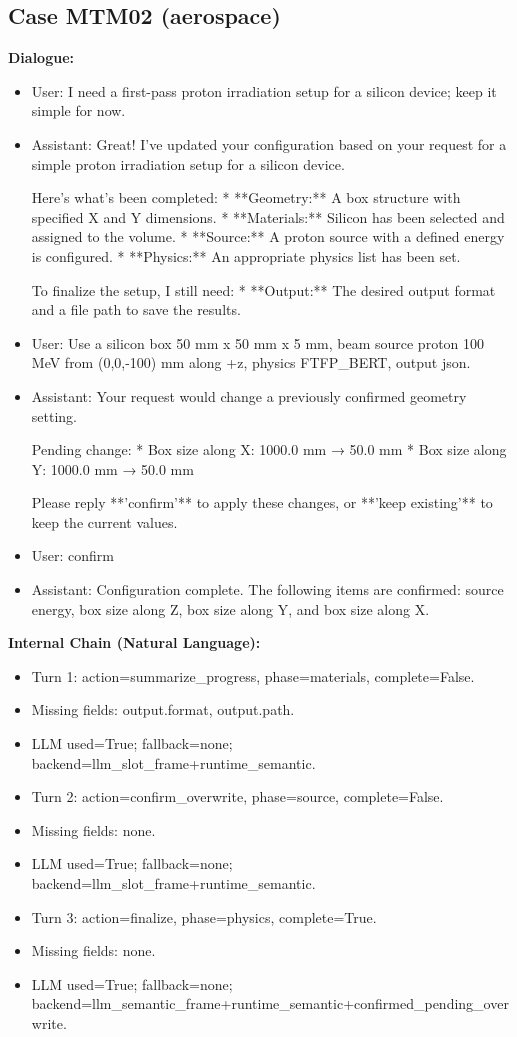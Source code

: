 \documentclass[11pt]{ctexart}
\begin{document}
\subsection{Case MTM02 (aerospace)}
\textbf{Dialogue:}
\begin{itemize}
\item User: I need a first-pass proton irradiation setup for a silicon device; keep it simple for now.
\item Assistant: Great! I've updated your configuration based on your request for a simple proton irradiation setup for a silicon device.

Here's what's been completed:
*   **Geometry:** A box structure with specified X and Y dimensions.
*   **Materials:** Silicon has been selected and assigned to the volume.
*   **Source:** A proton source with a defined energy is configured.
*   **Physics:** An appropriate physics list has been set.

To finalize the setup, I still need:
*   **Output:** The desired output format and a file path to save the results.
\item User: Use a silicon box 50 mm x 50 mm x 5 mm, beam source proton 100 MeV from (0,0,-100) mm along +z, physics FTFP\_BERT, output json.
\item Assistant: Your request would change a previously confirmed geometry setting.

Pending change:
*   Box size along X: 1000.0 mm → 50.0 mm
*   Box size along Y: 1000.0 mm → 50.0 mm

Please reply **'confirm'** to apply these changes, or **'keep existing'** to keep the current values.
\item User: confirm
\item Assistant: Configuration complete. The following items are confirmed: source energy, box size along Z, box size along Y, and box size along X.
\end{itemize}
\textbf{Internal Chain (Natural Language):}
\begin{itemize}
\item Turn 1: action=summarize\_progress, phase=materials, complete=False.
\item Missing fields: output.format, output.path.
\item LLM used=True; fallback=none; backend=llm\_slot\_frame+runtime\_semantic.
\item Turn 2: action=confirm\_overwrite, phase=source, complete=False.
\item Missing fields: none.
\item LLM used=True; fallback=none; backend=llm\_slot\_frame+runtime\_semantic.
\item Turn 3: action=finalize, phase=physics, complete=True.
\item Missing fields: none.
\item LLM used=True; fallback=none; backend=llm\_semantic\_frame+runtime\_semantic+confirmed\_pending\_overwrite.
\end{itemize}
\end{document}
